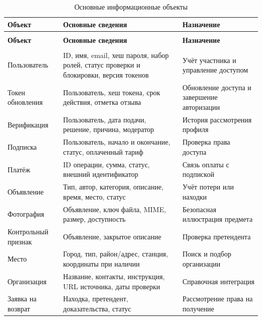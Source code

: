 \begingroup
{}
\fontsize{12}{14}\selectfont
\setlength{\tablecontentwidth}{\dimexpr\linewidth-6\tabcolsep-4\arrayrulewidth\relax}
\begin{longtable}{|>{\RaggedRight\arraybackslash}p{0.28\tablecontentwidth}|>{\RaggedRight\arraybackslash}p{0.32\tablecontentwidth}|>{\RaggedRight\arraybackslash}p{0.40\tablecontentwidth}|}
\caption{Основные информационные объекты}\label{tab:1}\\
\hline
\textbf{Объект} & \textbf{Основные сведения} & \textbf{Назначение} \\ \hline
\endfirsthead
\multicolumn{3}{r}{\footnotesize Продолжение таблицы \thetable} \\
\hline
\textbf{Объект} & \textbf{Основные сведения} & \textbf{Назначение} \\ \hline
\endhead
\multicolumn{3}{r}{\footnotesize Продолжение на следующей странице} \\
\endfoot
\endlastfoot
Пользователь & ID, имя, email, хеш пароля, набор ролей, статус проверки и блокировки, версия токенов & Учёт участника и управление доступом \\ \hline
Токен обновления & Пользователь, хеш токена, срок действия, отметка отзыва & Обновление доступа и завершение авторизации \\ \hline
Верификация & Пользователь, дата подачи, решение, причина, модератор & История рассмотрения профиля \\ \hline
Подписка & Пользователь, начало и окончание, статус, оплаченный тариф & Проверка права доступа \\ \hline
Платёж & ID операции, сумма, статус, внешний идентификатор & Связь оплаты с подпиской \\ \hline
Объявление & Тип, автор, категория, описание, время, место, статус & Учёт потери или находки \\ \hline
Фотография & Объявление, ключ файла, MIME, размер, доступность & Безопасная иллюстрация предмета \\ \hline
Контрольный признак & Объявление, закрытое описание & Проверка претендента \\ \hline
Место & Город, тип, район/\allowbreak{}адрес, станция, координаты при наличии & Поиск и подбор организации \\ \hline
Организация & Название, контакты, инструкция, URL источника, даты проверки & Справочная интеграция \\ \hline
Заявка на возврат & Находка, претендент, доказательства, статус & Рассмотрение права на получение \\ \hline

\end{longtable}

